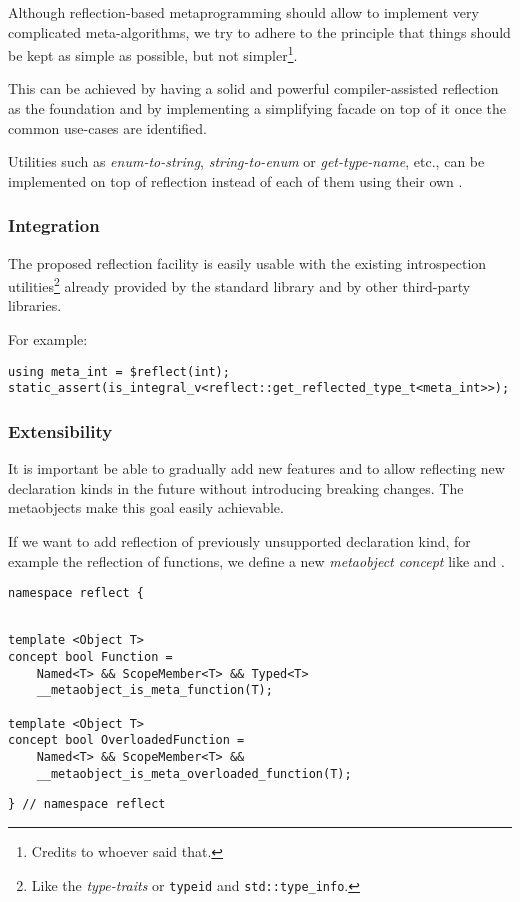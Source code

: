 Although reflection-based metaprogramming should allow to implement very
complicated meta-algorithms, we try to adhere to the principle that things
should be kept as simple as possible, but not simpler\footnote{Credits to
whoever said that.}.

This can be achieved by having a solid and powerful compiler-assisted reflection
as the foundation and by implementing a simplifying facade on top of it once
the common use-cases are identified.

Utilities such as {\em enum-to-string}, {\em string-to-enum} or {\em get-type-name},
etc., can be implemented on top of reflection instead of each of them using their own
.

\subsubsection{Integration}
\label{design-integration}

The proposed reflection facility is easily
usable with the existing introspection utilities\footnote{Like the
{\em type-traits} or \texttt{typeid} and \texttt{std::type\_info}.}
already provided by the standard library and by other third-party libraries.

For example:

\begin{verbatim}
using meta_int = $reflect(int);
static_assert(is_integral_v<reflect::get_reflected_type_t<meta_int>>);
\end{verbatim}

\subsubsection{Extensibility}
\label{design-extensibility}

It is important be able to gradually add new features and to allow
reflecting new declaration kinds in the future without introducing breaking changes.
The metaobjects make this goal easily achievable.

If we want to add reflection of previously unsupported declaration kind, for example
the reflection of functions, we define a new {\em metaobject concept} like
 and .

\begin{verbatim}
namespace reflect {
\end{verbatim}
\begin{verbatim}

template <Object T>
concept bool Function = 
	Named<T> && ScopeMember<T> && Typed<T>
	__metaobject_is_meta_function(T);

template <Object T>
concept bool OverloadedFunction =
	Named<T> && ScopeMember<T> &&
	__metaobject_is_meta_overloaded_function(T);

\end{verbatim}
\begin{verbatim}
} // namespace reflect
\end{verbatim}

